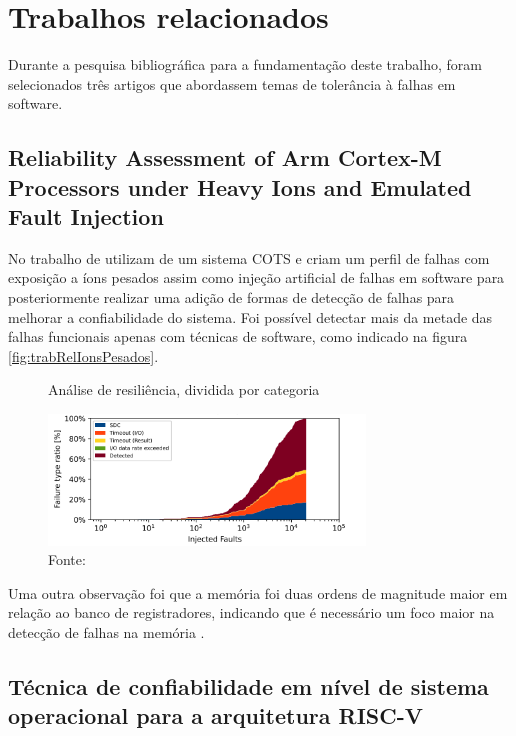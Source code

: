 \section{Trabalhos relacionados} \label{sec:trabRel}

Durante a pesquisa bibliográfica para a fundamentação deste trabalho, foram selecionados três artigos que abordassem temas de tolerância à falhas em software.

\subsection{Reliability Assessment of Arm Cortex-M Processors under Heavy Ions and Emulated Fault Injection}

No trabalho de  utilizam de um sistema COTS e criam um perfil de falhas com exposição a íons pesados assim como injeção artificial de falhas em software para posteriormente realizar uma adição de formas de detecção de falhas para melhorar a confiabilidade do sistema. Foi possível detectar mais da metade das falhas funcionais apenas com técnicas de software, como indicado na figura \autoref{fig:trabRelIonsPesados}.

\begin{figure}[H]
    \centering
    \captionsetup{justification=centering}
    \caption{Análise de resiliência, dividida por categoria}
    \includegraphics[width=0.75\textwidth]{assets/related_works_heavy_ion_reliability.png}
    \captionsetup{justification=raggedright}
    \caption*{Fonte: }
    \label{fig:trabRelIonsPesados}
\end{figure}

Uma outra observação foi que a memória foi duas ordens de magnitude maior em relação ao banco de registradores, indicando que é necessário um foco maior na detecção de falhas na memória \cite{ReliabilityArmCortexUnderHeavyIons}.

\subsection{Técnica de confiabilidade em nível de sistema operacional para a arquitetura RISC-V}

